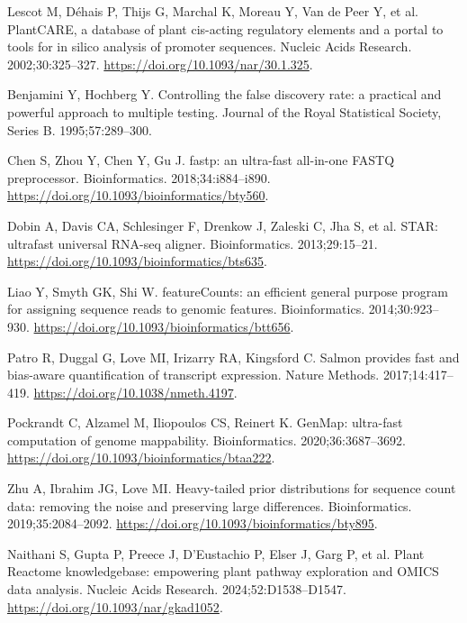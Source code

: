 \documentclass[referee,pdflatex,sn-basic,Numbered]{sn-jnl}
\begin{document}
\begin{enumerate}[label={[\arabic*]},itemsep=2pt,leftmargin=2.6em]
\item Lescot M, D\'ehais P, Thijs G, Marchal K, Moreau Y, Van de Peer Y, et al. PlantCARE, a database of plant cis-acting regulatory elements and a portal to tools for in silico analysis of promoter sequences. Nucleic Acids Research. 2002;30:325--327. \url{https://doi.org/10.1093/nar/30.1.325}.

\item Benjamini Y, Hochberg Y. Controlling the false discovery rate: a practical and powerful approach to multiple testing. Journal of the Royal Statistical Society, Series B. 1995;57:289--300.

\item Chen S, Zhou Y, Chen Y, Gu J. fastp: an ultra-fast all-in-one FASTQ preprocessor. Bioinformatics. 2018;34:i884--i890. \url{https://doi.org/10.1093/bioinformatics/bty560}.

\item Dobin A, Davis CA, Schlesinger F, Drenkow J, Zaleski C, Jha S, et al. STAR: ultrafast universal RNA-seq aligner. Bioinformatics. 2013;29:15--21. \url{https://doi.org/10.1093/bioinformatics/bts635}.

\item Liao Y, Smyth GK, Shi W. featureCounts: an efficient general purpose program for assigning sequence reads to genomic features. Bioinformatics. 2014;30:923--930. \url{https://doi.org/10.1093/bioinformatics/btt656}.

\item Patro R, Duggal G, Love MI, Irizarry RA, Kingsford C. Salmon provides fast and bias-aware quantification of transcript expression. Nature Methods. 2017;14:417--419. \url{https://doi.org/10.1038/nmeth.4197}.

\item Pockrandt C, Alzamel M, Iliopoulos CS, Reinert K. GenMap: ultra-fast computation of genome mappability. Bioinformatics. 2020;36:3687--3692. \url{https://doi.org/10.1093/bioinformatics/btaa222}.

\item Zhu A, Ibrahim JG, Love MI. Heavy-tailed prior distributions for sequence count data: removing the noise and preserving large differences. Bioinformatics. 2019;35:2084--2092. \url{https://doi.org/10.1093/bioinformatics/bty895}.

\item Naithani S, Gupta P, Preece J, D'Eustachio P, Elser J, Garg P, et al. Plant Reactome knowledgebase: empowering plant pathway exploration and OMICS data analysis. Nucleic Acids Research. 2024;52:D1538--D1547. \url{https://doi.org/10.1093/nar/gkad1052}.


\end{enumerate}
\end{document}
